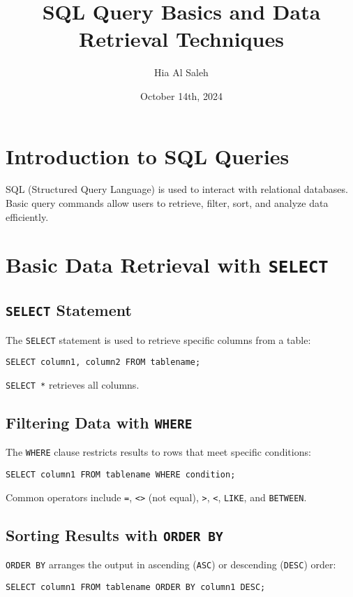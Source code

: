 \documentclass{article}
\begin{document}
\title{SQL Query Basics and Data Retrieval Techniques}
\author{Hia Al Saleh}
\date{October 14th, 2024}
\maketitle
\tableofcontents
\newpage

\section{Introduction to SQL Queries}
SQL (Structured Query Language) is used to interact with relational databases. Basic query commands allow users to retrieve, filter, sort, and analyze data efficiently.

\section{Basic Data Retrieval with \texttt{SELECT}}
\subsection{\texttt{SELECT} Statement}
The \texttt{SELECT} statement is used to retrieve specific columns from a table:
\begin{verbatim}
SELECT column1, column2 FROM tablename;
\end{verbatim}
\texttt{SELECT *} retrieves all columns.

\subsection{Filtering Data with \texttt{WHERE}}
The \texttt{WHERE} clause restricts results to rows that meet specific conditions:
\begin{verbatim}
SELECT column1 FROM tablename WHERE condition;
\end{verbatim}
Common operators include \texttt{=}, \texttt{<>} (not equal), \texttt{>}, \texttt{<}, \texttt{LIKE}, and \texttt{BETWEEN}.

\subsection{Sorting Results with \texttt{ORDER BY}}
\texttt{ORDER BY} arranges the output in ascending (\texttt{ASC}) or descending (\texttt{DESC}) order:
\begin{verbatim}
SELECT column1 FROM tablename ORDER BY column1 DESC;
\end{verbatim}
\end{document}
